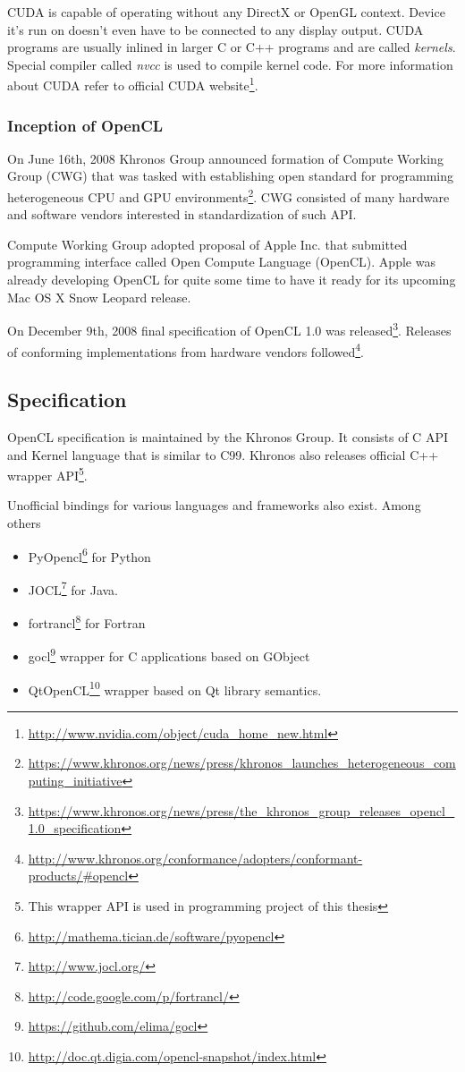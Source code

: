 CUDA is capable of operating without any DirectX or OpenGL context. Device it's
run on doesn't even have to be connected to any display output. CUDA programs
are usually inlined in larger C or C++ programs and are called \emph{kernels}.
Special compiler called \emph{nvcc} is used to compile kernel code. For more
information about CUDA refer to official CUDA website\footnote{\url{http://www.nvidia.com/object/cuda_home_new.html}}.

\subsubsection{Inception of OpenCL}

On June 16th, 2008 Khronos Group announced formation of Compute Working Group (CWG)
that was tasked with establishing open standard for programming heterogeneous
CPU and GPU environments\footnote{\url{https://www.khronos.org/news/press/khronos\_launches\_heterogeneous\_computing\_initiative}}.
CWG consisted of many hardware and software vendors interested in
standardization of such API.

Compute Working Group adopted proposal of Apple Inc. that submitted programming
interface called Open Compute Language (OpenCL). Apple was already developing
OpenCL for quite some time to have it ready for its upcoming Mac OS X Snow
Leopard release.

On December 9th, 2008 final specification of OpenCL 1.0 was
released\footnote{\url{https://www.khronos.org/news/press/the\_khronos\_group\_releases\_opencl\_1.0\_specification}}.
Releases of conforming implementations from hardware vendors followed\footnote{\url{http://www.khronos.org/conformance/adopters/conformant-products/\#opencl}}.

\subsection{Specification}
OpenCL specification is maintained by the Khronos Group. It consists of C API
and Kernel language that is similar to C99. Khronos also releases official C++
wrapper API\footnote{This wrapper API is used in programming project of this thesis}.

Unofficial bindings for various languages and frameworks also exist. Among others
\begin{itemize}
	\item PyOpencl\footnote{\url{http://mathema.tician.de/software/pyopencl}}
		for Python
	\item JOCL\footnote{\url{http://www.jocl.org/}} for Java.
	\item fortrancl\footnote{\url{http://code.google.com/p/fortrancl/}} for Fortran
	\item gocl\footnote{\url{https://github.com/elima/gocl}} wrapper for C
		applications based on GObject
	\item QtOpenCL\footnote{\url{http://doc.qt.digia.com/opencl-snapshot/index.html}}
		wrapper based on Qt library semantics.
\end{itemize}


